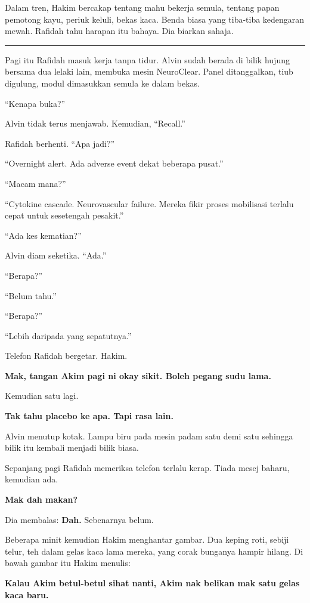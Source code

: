 \documentclass[
  11pt,
  a5paper,
  openany,
  oneside]{book}
\begin{document}
Dalam tren, Hakim bercakap tentang mahu bekerja semula, tentang papan
pemotong kayu, periuk keluli, bekas kaca. Benda biasa yang tiba-tiba
kedengaran mewah. Rafidah tahu harapan itu bahaya. Dia biarkan sahaja.

\begin{center}\rule{0.5\linewidth}{0.5pt}\end{center}

Pagi itu Rafidah masuk kerja tanpa tidur. Alvin sudah berada di bilik
hujung bersama dua lelaki lain, membuka mesin NeuroClear. Panel
ditanggalkan, tiub digulung, modul dimasukkan semula ke dalam bekas.

``Kenapa buka?''

Alvin tidak terus menjawab. Kemudian, ``Recall.''

Rafidah berhenti. ``Apa jadi?''

``Overnight alert. Ada adverse event dekat beberapa pusat.''

``Macam mana?''

``Cytokine cascade. Neurovascular failure. Mereka fikir proses
mobilisasi terlalu cepat untuk sesetengah pesakit.''

``Ada kes kematian?''

Alvin diam seketika. ``Ada.''

``Berapa?''

``Belum tahu.''

``Berapa?''

``Lebih daripada yang sepatutnya.''

Telefon Rafidah bergetar. Hakim.

\textbf{Mak, tangan Akim pagi ni okay sikit. Boleh pegang sudu lama.}

Kemudian satu lagi.

\textbf{Tak tahu placebo ke apa. Tapi rasa lain.}

Alvin menutup kotak. Lampu biru pada mesin padam satu demi satu sehingga
bilik itu kembali menjadi bilik biasa.

Sepanjang pagi Rafidah memeriksa telefon terlalu kerap. Tiada mesej
baharu, kemudian ada.

\textbf{Mak dah makan?}

Dia membalas: \textbf{Dah.} Sebenarnya belum.

Beberapa minit kemudian Hakim menghantar gambar. Dua keping roti, sebiji
telur, teh dalam gelas kaca lama mereka, yang corak bunganya hampir
hilang. Di bawah gambar itu Hakim menulis:

\textbf{Kalau Akim betul-betul sihat nanti, Akim nak belikan mak satu
gelas kaca baru.}
\end{document}

